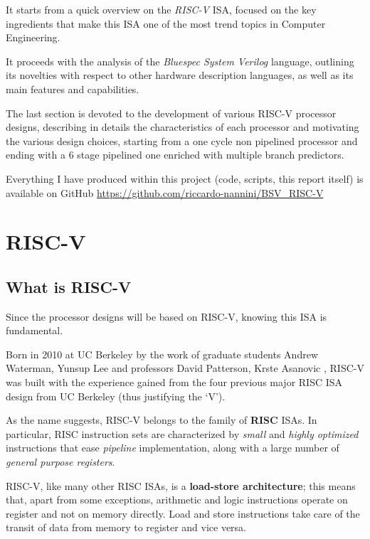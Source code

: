 \documentclass[12pt,oneside,a4paper]{article}
\begin{document}
It starts from a quick overview on the \textit{RISC-V} ISA, focused on the key ingredients that make this ISA one of the most trend topics in Computer Engineering.

It proceeds with the analysis of the \textit{Bluespec System Verilog} language, outlining its novelties with respect to other hardware description languages, as well as its main features and capabilities. 

The last section is devoted to the development of various RISC-V processor designs, describing in details the characteristics of each processor and motivating the various design choices, starting from a one cycle non pipelined processor and ending with a 6 stage pipelined one enriched with multiple branch predictors.

Everything I have produced within this project (code, scripts, this report itself) is available on GitHub \url{https://github.com/riccardo-nannini/BSV_RISC-V}


\section{RISC-V} \label{sec:risc-v}
\subsection{What is RISC-V}
Since the processor designs will be based on RISC-V, knowing this ISA is fundamental.

Born in 2010 at UC Berkeley by the work of graduate students Andrew Waterman, Yunsup Lee and professors David Patterson, Krste Asanovic \cite{risc-v_original}, RISC-V was built with the experience gained from the four previous major RISC ISA design from UC Berkeley (thus justifying the ‘V’).

As the name suggests, RISC-V belongs to the family of \textbf{RISC} ISAs. In particular, RISC instruction sets are characterized by \textit{small} and \textit{highly optimized} instructions that ease \textit{pipeline} implementation, along with a large number of \textit{general purpose registers}. 

RISC-V, like many other RISC ISAs, is a \textbf{load-store architecture}; this means that, apart from some exceptions, arithmetic and logic instructions operate on register and not on memory directly. Load and store instructions take care of the transit of data from memory to register and vice versa.
\end{document}
